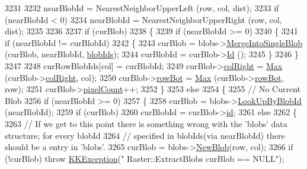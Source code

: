 \begin{DoxyCode}
3231 
3232         nearBlobId = NearestNeighborUpperLeft (row, col, dist);
3233         \textcolor{keywordflow}{if}  (nearBlobId < 0)
3234           nearBlobId = NearestNeighborUpperRight (row, col, dist);
3235 
3236 
3237         \textcolor{keywordflow}{if}  (curBlob)
3238         \{
3239           \textcolor{keywordflow}{if}  (nearBlobId >= 0)
3240           \{
3241             \textcolor{keywordflow}{if}  (nearBlobId != curBlobId)
3242             \{
3243               curBlob = blobs->\hyperlink{class_k_k_b_1_1_blob_list_a6fb445ebcc2275344dd3301cc0b72bb1}{MergeIntoSingleBlob} (curBlob, nearBlobId, 
      \hyperlink{class_k_k_b_1_1_raster_a0fc9a1588e809db0b701f0a886bfd18c}{blobIds});
3244               curBlobId = curBlob->\hyperlink{class_k_k_b_1_1_blob_add1ed75f6509956508b71aabeeae213c}{Id} ();
3245             \}
3246           \}
3247 
3248           curRowBlobIds[col] = curBlobId;
3249           curBlob->\hyperlink{class_k_k_b_1_1_blob_a3786c83aeb9b92bc076c14afcc99c463}{colRight}  = \hyperlink{namespace_k_k_b_a25e187e24c091586293725f27f007ad7}{Max} (curBlob->\hyperlink{class_k_k_b_1_1_blob_a3786c83aeb9b92bc076c14afcc99c463}{colRight}, col);
3250           curBlob->\hyperlink{class_k_k_b_1_1_blob_ae6f6816134ac19c54071eca96dd89910}{rowBot}    = \hyperlink{namespace_k_k_b_a25e187e24c091586293725f27f007ad7}{Max} (curBlob->\hyperlink{class_k_k_b_1_1_blob_ae6f6816134ac19c54071eca96dd89910}{rowBot},   row);
3251           curBlob->\hyperlink{class_k_k_b_1_1_blob_a415767d4a364df537d7b2fc06a95721d}{pixelCount}++;
3252         \}
3253         \textcolor{keywordflow}{else}
3254         \{
3255           \textcolor{comment}{// No Current Blob}
3256           \textcolor{keywordflow}{if}  (nearBlobId >= 0)
3257           \{
3258             curBlob   = blobs->\hyperlink{class_k_k_b_1_1_blob_list_a3acd3cdb0c08780511f2087f72749b91}{LookUpByBlobId} (nearBlobId);
3259             \textcolor{keywordflow}{if}  (curBlob)
3260               curBlobId = curBlob->\hyperlink{class_k_k_b_1_1_blob_af752299192d447637bd6c56d4b1e0660}{id};
3261             \textcolor{keywordflow}{else}
3262             \{
3263               \textcolor{comment}{// If we get to this point there is something wrong with the 'blobs' data structure; for
       every blobId}
3264               \textcolor{comment}{// specified in blobIds(via nearBlobId) there should be a entry in 'blobs'.}
3265               curBlob = blobs->\hyperlink{class_k_k_b_1_1_blob_list_a4542efb8f886b31c58f0a03507d20e69}{NewBlob}(row, col);
3266               \textcolor{keywordflow}{if}  (!curBlob)  \textcolor{keywordflow}{throw} \hyperlink{class_k_k_b_1_1_k_k_exception}{KKException}(\textcolor{stringliteral}{" Raster::ExtractBlobs   curBlob == NULL"});

\end{DoxyCode}
